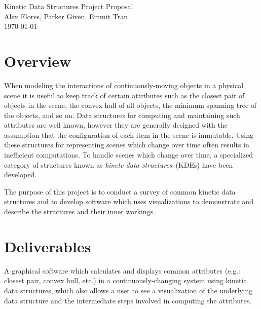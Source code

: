 \documentclass[letterpaper,oneside,12pt]{article}
\begin{document}
  \nocite{*}
  \pagestyle{plain}
  \begin{center}
    {\LARGE Kinetic Data Structures Project Proposal} \\ 
    {\Large Alex Flores, Parker Given, Emmit Tran } \\
    {\large \today } \\
  \end{center}

  \section*{Overview}

  \noindent When modeling the interactions of continuously-moving objects in a physical
  scene it is useful to keep track of certain attributes such as the closest pair of
  objects in the scene, the convex hull of all objects, the minimum spanning tree of
  the objects, and so on. Data structures for computing and maintaining such attributes 
  are well known, however they are generally designed with the assumption that the 
  configuration of each item in the scene is immutable. Using these structures 
  for representing scenes which change over time often results in inefficient computations. 
  To handle scenes which change over time, a specialized category of structures known as
  \textit{kinetc data structures}~(KDEs) have been developed.
  
  \noindent The purpose of this project is to conduct a survey of common kinetic data
  structures and to develop software which uses visualizations to demonstrate and describe
  the structures and their inner workings.

  \section*{Deliverables}
  A graphical software which calculates and displays common attributes (e.g.: closest pair, 
  convex hull, etc.) in a continuously-changing system using kinetic data structures, which
  also allows a user to see a visualization of the underlying data structure and the intermediate
  steps involved in computing the attributes.

  \renewcommand\refname{Tentative Bibliography}
  
  
\end{document}

